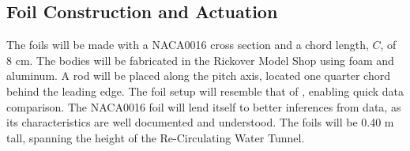 \subsection{Foil Construction and Actuation} \label{Foil Construction and Actuation}
    
    The foils will be made with a NACA0016 cross section and a chord length, \(C\), of 8 cm. The bodies will be fabricated in the Rickover Model Shop using foam and aluminum. A rod will be placed along the pitch axis, located one quarter chord behind the leading edge. The foil setup will resemble that of \citep{Boschitsch2014}, enabling quick data comparison. The NACA0016 foil will lend itself to better inferences from  data, as its characteristics are well documented and understood. The foils will be 0.40 m tall, spanning the height of the Re-Circulating Water Tunnel. 
    
